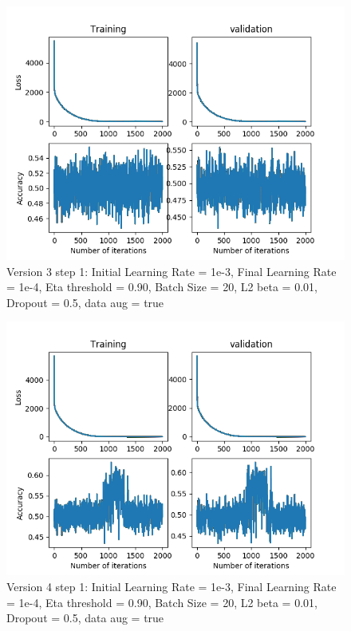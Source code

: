 \documentclass[12pt,reqno]{amsart}
\numberwithin{equation}{section}
\begin{document}
\begin{enumerate}
\begin{figure}[H]
\centering
\includegraphics[scale=0.6]{data_liquid140_version3_step1}
\caption{Version 3 step 1: Initial Learning Rate = 1e-3, Final Learning Rate = 1e-4, Eta threshold = 0.90, Batch Size = 20, L2 beta = 0.01, Dropout = 0.5, data aug = true}
\end{figure}

\begin{figure}[H]
\centering
\includegraphics[scale=0.6]{data_liquid140_version4_step1}
\caption{Version 4 step 1: Initial Learning Rate = 1e-3, Final Learning Rate = 1e-4, Eta threshold = 0.90, Batch Size = 20, L2 beta = 0.01, Dropout = 0.5, data aug = true}
\end{figure}


\end{enumerate}
\end{document}
